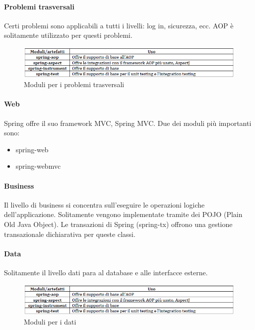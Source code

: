 \documentclass[11pt,a4paper]{book}
\begin{document}
\paragraph{Problemi trasversali}
Certi problemi sono applicabili a tutti i livelli: log in, sicurezza, ecc. AOP è solitamente utilizzato per questi problemi.
\begin{figure}[h!]
	\begin{center}
		\includegraphics[scale=0.6]{img/021.png}
		\caption{Moduli per i problemi trasversali}
		\label{fig: 021}
	\end{center}
\end{figure}
\paragraph{Web}
Spring offre il suo framework MVC, Spring MVC. Due dei moduli più importanti sono:
\begin{itemize}
	\item spring-web
	\item spring-webmvc
\end{itemize}
\paragraph{Business}
Il livello di business si concentra sull'eseguire le operazioni logiche dell'applicazione. Solitamente vengono implementate tramite dei POJO (Plain Old Java Object). Le transazioni di Spring (spring-tx) offrono una gestione transazionale dichiarativa per queste classi.
\paragraph{Data}
Solitamente il livello dati para al database e alle interfacce esterne.
\begin{figure}[h!]
	\begin{center}
		\includegraphics[scale=0.6]{img/021.png}
		\caption{Moduli per i dati}
		\label{fig: 022}
	\end{center}
\end{figure}
\end{document}
